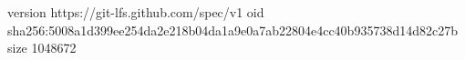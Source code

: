 version https://git-lfs.github.com/spec/v1
oid sha256:5008a1d399ee254da2e218b04da1a9e0a7ab22804e4cc40b935738d14d82c27b
size 1048672
